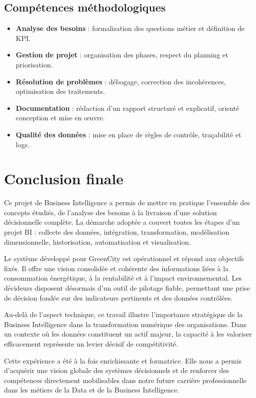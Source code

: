 \documentclass[12pt,a4paper]{report}
\begin{document}
\subsection{Compétences méthodologiques}

\begin{itemize}
    \item \textbf{Analyse des besoins} : formalisation des questions métier et définition de KPI.
    \item \textbf{Gestion de projet} : organisation des phases, respect du planning et priorisation.
    \item \textbf{Résolution de problèmes} : débogage, correction des incohérences, optimisation des traitements.
    \item \textbf{Documentation} : rédaction d’un rapport structuré et explicatif, orienté conception et mise en œuvre.
    \item \textbf{Qualité des données} : mise en place de règles de contrôle, traçabilité et logs.
\end{itemize}



\section{Conclusion finale}

Ce projet de Business Intelligence a permis de mettre en pratique l’ensemble des concepts étudiés, de l’analyse des besoins à la livraison d’une solution décisionnelle complète. La démarche adoptée a couvert toutes les étapes d’un projet BI : collecte des données, intégration, transformation, modélisation dimensionnelle, historisation, automatisation et visualisation.

Le système développé pour GreenCity est opérationnel et répond aux objectifs fixés. Il offre une vision consolidée et cohérente des informations liées à la consommation énergétique, à la rentabilité et à l’impact environnemental. Les décideurs disposent désormais d’un outil de pilotage fiable, permettant une prise de décision fondée sur des indicateurs pertinents et des données contrôlées.

Au-delà de l’aspect technique, ce travail illustre l’importance stratégique de la Business Intelligence dans la transformation numérique des organisations. Dans un contexte où les données constituent un actif majeur, la capacité à les valoriser efficacement représente un levier décisif de compétitivité.

Cette expérience a été à la fois enrichissante et formatrice. Elle nous a permis d’acquérir une vision globale des systèmes décisionnels et de renforcer des compétences directement mobilisables dans notre future carrière professionnelle dans les métiers de la Data et de la Business Intelligence.
\end{document}
